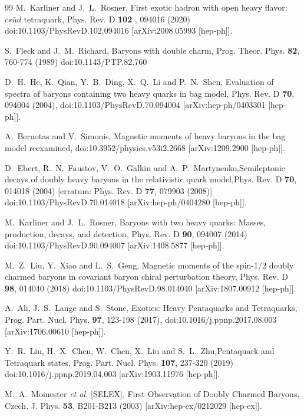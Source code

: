 \documentclass[prd,twocolumn,floatfix,nofootinbib]{revtex4}
\begin{document}
\begin{thebibliography}{99}
 M.~Karliner and J.~L.~Rosner, First exotic hadron
with open heavy flavor: $cs\bar u\bar d$ tetraquark, Phys. Rev. D \textbf{102%
}, 094016 (2020) doi:10.1103/PhysRevD.102.094016 [arXiv:2008.05993 [hep-ph]].

 S.~Fleck and J.~M.~Richard, Baryons with double
charm, Prog. Theor. Phys. \textbf{82}, 760-774 (1989) doi:10.1143/PTP.82.760

 D.~H.~He, K.~Qian, Y.~B.~Ding, X.~Q.~Li and P.~N.~Shen,
Evaluation of spectra of baryons containing two heavy quarks in bag model,
Phys. Rev. D \textbf{70}, 094004 (2004), doi:10.1103/PhysRevD.70.094004
[arXiv:hep-ph/0403301 [hep-ph]].

 A.~Bernotas and V.~Simonis, Magnetic moments of
heavy baryons in the bag model reexamined, doi:10.3952/physics.v53i2.2668
[arXiv:1209.2900 [hep-ph]].

 D.~Ebert, R.~N.~Faustov, V.~O.~Galkin and
A.~P.~Martynenko,Semileptonic decays of doubly heavy baryons in the
relativistic quark model,Phys. Rev. D \textbf{70}, 014018 (2004) [erratum:
Phys. Rev. D \textbf{77}, 079903 (2008)] doi:10.1103/PhysRevD.70.014018
[arXiv:hep-ph/0404280 [hep-ph]].

 M.~Karliner and J.~L.~Rosner, Baryons with two heavy
quarks: Masses, production, decays, and detection, Phys. Rev. D \textbf{90},
094007 (2014) doi:10.1103/PhysRevD.90.094007 [arXiv:1408.5877 [hep-ph]].

 M.~Z.~Liu, Y.~Xiao and L.~S.~Geng, Magnetic moments of
the spin-1/2 doubly charmed baryons in covariant baryon chiral perturbation
theory, Phys. Rev. D \textbf{98}, 014040 (2018)
doi:10.1103/PhysRevD.98.014040 [arXiv:1807.00912 [hep-ph]].

 A.~Ali, J.~S.~Lange and S.~Stone, Exotics: Heavy
Pentaquarks and Tetraquarks, Prog. Part. Nucl. Phys. \textbf{97}, 123-198
(2017), doi:10.1016/j.ppnp.2017.08.003 [arXiv:1706.00610 [hep-ph]].

 Y.~R.~Liu, H.~X.~Chen, W.~Chen, X.~Liu and
S.~L.~Zhu,Pentaquark and Tetraquark states, Prog. Part. Nucl. Phys. \textbf{%
107}, 237-320 (2019) doi:10.1016/j.ppnp.2019.04.003 [arXiv:1903.11976
[hep-ph]].

 M.~A.~Moinester \textit{et al.} [SELEX], First
Observation of Doubly Charmed Baryons, Czech. J. Phys. \textbf{53},
B201-B213 (2003) [arXiv:hep-ex/0212029 [hep-ex]].


\end{thebibliography}
\end{document}
